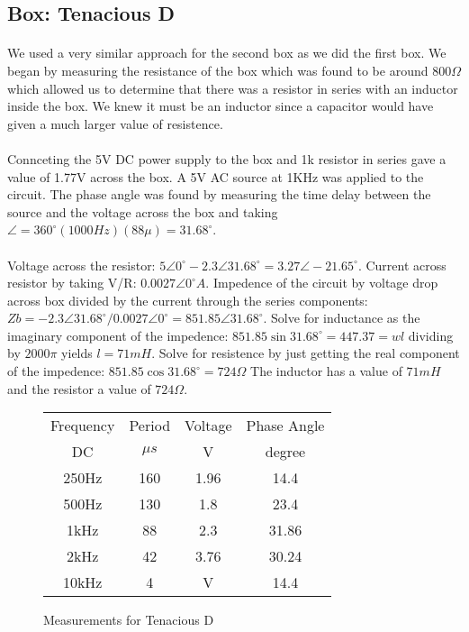 \documentclass{article}
\begin{document}
\subsection*{Box: Tenacious D}
\paragraph{}
We used a very similar approach for the second box as we did the first box. We
began by measuring the resistance of the box which was found to be around
$800\Omega$ which allowed us to determine that there was a resistor in series
with an inductor inside the box. 
We knew it must be an inductor since a capacitor 
would have given a much larger value of resistence. 
\paragraph{}
Connceting the 5V DC power supply to the box and 1k resistor in series gave a 
value of 1.77V across the box. A 5V AC source at 1KHz was applied to the circuit.
The phase angle was found by measuring the time delay between the source and 
the voltage across the box and taking $\angle{} = 360^\circ{}(1000Hz)(88\mu{}) = 31.68^\circ{}$.
\paragraph{}
Voltage across the resistor: $5\angle{}0^\circ{} - 2.3\angle{}31.68^\circ{} = 3.27\angle{}-21.65^\circ{}$.
Current across resistor by taking V/R: $0.0027\angle{}0^\circ{}A$.
Impedence of the circuit by voltage drop across box divided by the current through the series components: 
$Zb= -2.3\angle{}31.68^\circ{} / 0.0027\angle{}0^\circ{} = 851.85\angle{}31.68^\circ{}$.
Solve for inductance as the imaginary component of the impedence: $851.85\sin{}31.68^\circ{} = 447.37 = wl$ 
dividing by $2000\pi{}$ yields $l=71mH$.
Solve for resistence by just getting the real component of the impedence: 
$851.85\cos{}31.68^\circ{} = 724\Omega$
The inductor has a value of $71mH$ and the resistor a value of $724\Omega$.


\begin{figure}[!h]
\caption{Measurements for Tenacious D}
\begin{center}
\begin{tabular}{|c|c|c|c|}
\hline
Frequency & Period & Voltage & Phase Angle\\
DC & $\mu{}s$ & V & degree\\
\hline
250Hz & 160 & 1.96 & 14.4\\
\hline
500Hz & 130 & 1.8 & 23.4\\
\hline
1kHz & 88 & 2.3 & 31.86\\
\hline
2kHz & 42 & 3.76 & 30.24\\
\hline
10kHz & 4 & V & 14.4\\
\hline
\end{tabular}
\end{center}
\end{figure}
\end{document}
